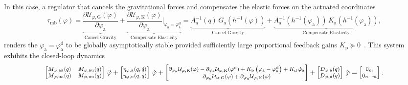In this case, a regulator that cancels the gravitational forces and compensates the elastic forces on the actuated coordinates
\begin{equation}
    \tau_\mathrm{mb}(\varphi) = \underbrace{\frac{\partial \mathcal{U}_{\varphi,\mathrm{G}}(\varphi)}{\partial \varphi_\mathrm{a}}}_\text{Cancel Gravity} + \underbrace{\frac{\partial \mathcal{U}_{\varphi,\mathrm{K}}(\varphi)}{\partial \varphi_\mathrm{a}} \bigg |_{\varphi_\mathrm{a}=\varphi_\mathrm{a}^\mathrm{d}}}_\text{Compensate Elasticity} = \underbrace{A_\mathrm{a}^{-1}(q) \, G_\mathrm{a}(h^{-1}(\varphi))}_\text{Cancel Gravity} + \underbrace{A_\mathrm{a}^{-1}(h^{-1}(\varphi_\mathrm{a})) \, K_\mathrm{a}(h^{-1}(\varphi_\mathrm{a}))}_\text{Compensate Elasticity},
\end{equation}
renders the $\varphi_\mathrm{a} = \varphi_\mathrm{a}^\mathrm{d}$ to be globally asymptotically stable provided sufficiently large proportional feedback gains $K_\mathrm{p} \succeq 0$~\citep{pustina2025analysis}.
This system exhibits the closed-loop dynamics
\begin{equation}\footnotesize
    \begin{bmatrix}
        M_{\varphi,\mathrm{aa}}(q) & M_{\varphi,\mathrm{au}}(q)\\ 
        M_{\varphi,\mathrm{ua}}(q) & M_{\varphi,\mathrm{uu}}(q)
    \end{bmatrix} \, \ddot{\varphi} + \begin{bmatrix}
        \eta_{\varphi,\mathrm{a}}(q,\dot{q})\\ \eta_{\varphi,\mathrm{u}}(q,\dot{q})
    \end{bmatrix} \, \dot{\varphi} + \begin{bmatrix}
       \partial_{\varphi_\mathrm{a}} \mathcal{U}_{\varphi,\mathrm{K}}(\varphi) - \partial_{\varphi_\mathrm{a}} \mathcal{U}_{\varphi,\mathrm{K}}(\varphi^\mathrm{d}) + K_\mathrm{p} \left ( \varphi_\mathrm{a} - \varphi^\mathrm{d}_\mathrm{a} \right ) + K_\mathrm{d} \, \dot{\varphi}_\mathrm{a}\\
       \partial_{\varphi_\mathrm{u}} \mathcal{U}_{\varphi,\mathrm{G}}(\varphi) + \partial_{\varphi_\mathrm{u}} \mathcal{U}_{\varphi,\mathrm{K}}(\varphi)
    \end{bmatrix} + \begin{bmatrix}
        D_{\varphi,\mathrm{a}}(q)\\
        D_{\varphi,\mathrm{u}}(q)
    \end{bmatrix} \, \dot{\varphi} = \begin{bmatrix}
        0_m\\ 0_{n-m}
    \end{bmatrix}.
\end{equation}
